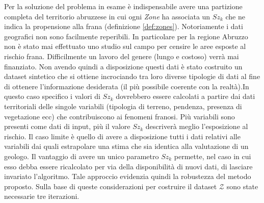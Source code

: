 Per la soluzione del problema in esame è indispensabile avere una partizione completa del territorio abruzzese in cui ogni \textit{Zone} ha associata un $Sz_k$ che ne indica la propensione alla frana (definizione \ref{def:zones}). Notoriamente i dati geografici non sono facilmente reperibili. In particolare per la regione Abruzzo non è stato mai effettuato uno studio sul campo per censire le aree esposte al rischio frana. Difficilmente un lavoro del genere (lungo e costoso) verrà mai finanziato. Non avendo quindi a disposizione questi dati è stato costruito un dataset sintetico che si ottiene incrociando tra loro diverse tipologie di dati al fine di ottenere l'informazione desiderata (il più possibile coerente con la realtà).\newline In questo caso specifico i valori di $Sz_k$ dovrebbero essere calcolati a partire dai dati territoriali delle singole variabili (tipologia di terreno, pendenza, presenza di vegetazione ecc) che contribuiscono ai fenomeni franosi. Più variabili sono presenti come dati di input, più il valore $Sz_k$ descriverà meglio l'esposizione al rischio. Il caso limite è quello di avere a disposizione tutti i dati relativi alle variabili dai quali estrapolare una stima che sia identica alla valutazione di un geologo. Il vantaggio di avere un unico parametro $Sz_k$ permette, nel caso in cui esso debba essere ricalcolato per via della disponibilità di nuovi dati, di lasciare invariato l'algoritmo. Tale approccio evidenzia quindi la robustezza del metodo proposto. Sulla base di queste considerazioni per costruire il dataset $\mathcal{Z}$ sono state necessarie tre iterazioni.

